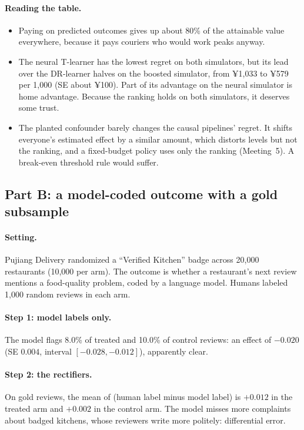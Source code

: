 \documentclass[11pt]{article}
\begin{document}
\paragraph{Reading the table.}
\begin{itemize}
  \item Paying on predicted outcomes gives up about 80\% of the attainable value everywhere, because it pays couriers who would work
  peaks anyway.
  \item The neural T-learner has the lowest regret on both simulators, but its lead over the DR-learner halves on the boosted simulator,
  from ¥1{,}033 to ¥579 per 1{,}000 (SE about ¥100). Part of its advantage on the neural simulator is home advantage. Because the ranking
  holds on both simulators, it deserves some trust.
  \item The planted confounder barely changes the causal pipelines' regret. It shifts everyone's estimated effect by a similar amount, which
  distorts levels but not the ranking, and a fixed-budget policy uses only the ranking (Meeting~5). A break-even threshold rule would suffer.
\end{itemize}

\subsection*{Part B: a model-coded outcome with a gold subsample}

\paragraph{Setting.} Pujiang Delivery randomized a ``Verified Kitchen'' badge across 20{,}000 restaurants (10{,}000 per arm). The outcome is whether a
restaurant's next review mentions a food-quality problem, coded by a language model. Humans labeled 1{,}000 random reviews in each arm.

\paragraph{Step 1: model labels only.} The model flags 8.0\% of treated and 10.0\% of control reviews: an effect of $-0.020$ (SE $0.004$,
interval $[-0.028, -0.012]$), apparently clear.

\paragraph{Step 2: the rectifiers.} On gold reviews, the mean of (human label minus model label) is $+0.012$ in the treated arm and $+0.002$ in the
control arm. The model misses more complaints about badged kitchens, whose reviewers write more politely: differential error.
\end{document}
